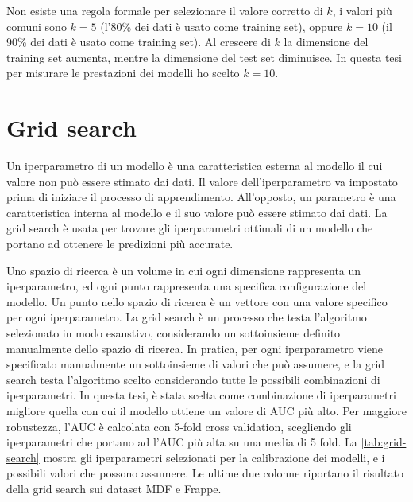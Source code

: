 \documentclass[12pt,italian]{report}
\begin{document}
Non esiste una regola formale per selezionare il valore corretto di $k$, i valori più comuni sono $k=5$ (l'80\% dei dati è usato come training set), oppure $k=10$ (il 90\% dei dati è usato come training set). Al crescere di $k$ la dimensione del training set aumenta, mentre la dimensione del test set diminuisce. In questa tesi per misurare le prestazioni dei modelli ho scelto $k = 10$.

\section{Grid search} \label{sec:grid-search}
Un iperparametro di un modello è una caratteristica esterna al modello il cui valore non può essere stimato dai dati. Il valore dell'iperparametro va impostato prima di iniziare il processo di apprendimento. All'opposto, un parametro è una caratteristica interna al modello e il suo valore può essere stimato dai dati. La grid search è usata per trovare gli iperparametri ottimali di un modello che portano ad ottenere le predizioni più accurate. 

Uno spazio di ricerca è un volume in cui ogni dimensione rappresenta un iperparametro, ed ogni punto rappresenta una specifica configurazione del modello. Un punto nello spazio di ricerca è un vettore con una valore specifico per ogni iperparametro. La grid search è un processo che testa l'algoritmo selezionato in modo esaustivo, considerando un sottoinsieme definito manualmente dello spazio di ricerca. In pratica, per ogni iperparametro viene specificato manualmente un sottoinsieme di valori che può assumere, e la grid search testa l'algoritmo scelto
considerando tutte le possibili combinazioni di iperparametri.
In questa tesi, è stata scelta come combinazione di iperparametri migliore quella con cui il modello ottiene un valore di AUC più alto. Per maggiore robustezza, l'AUC è calcolata con 5-fold cross validation, scegliendo gli iperparametri che portano ad l'AUC più alta su una media di 5 fold. La \autoref{tab:grid-search} mostra gli iperparametri selezionati per la calibrazione dei modelli, e i possibili valori che possono assumere. Le ultime due colonne riportano il risultato della grid search sui dataset MDF e Frappe.
\end{document}
